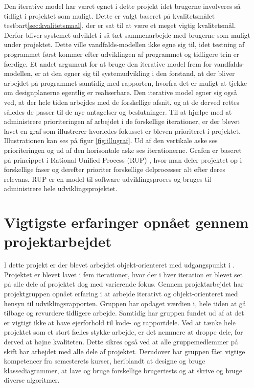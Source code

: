 Den iterative model har været egnet i dette projekt idet brugerne involveres så tidligt i projektet som muligt. Dette er valgt baseret på kvalitetsmålet testbart\ref{sec:kvalitetsmaal}, der er sat til at være et meget vigtig kvalitetsmål. Derfor bliver systemet udviklet i så tæt sammenarbejde med brugerne som muligt under projektet. Dette ville vandfalds-modellen ikke egne sig til, idet testning af programmet først kommer efter udviklingen af programmet og tidligere trin er færdige.
Et andet argument for at bruge den iterative model frem for vandfalds-modellen, er at den egner sig til systemudvikling i den forstand, at der bliver arbejdet på programmet samtidig med rapporten, hvorfra det er muligt at tjekke om designplanerne egentlig er realiserbare. Den iterative model egner sig også ved, at der hele tiden arbejdes med de forskellige afsnit, og at de derved rettes således de passer til de nye antagelser og beslutninger.
Til at hjælpe med at administrere prioriteringen af arbejdet i de forskellige iterationer, er der blevet lavet en graf som illustrerer hvorledes fokusset er bleven prioriteret i projektet. Illustrationen kan ses på figur \ref{fig:illugraf}. Ud af den vertikale aske ses prioriteringen og ud af den horisontale aske ses iterationerne. Grafen er baseret på princippet i Rational Unified Process (RUP) \citep{RUP}, hvor man deler projektet op i forskellige faser og derefter prioriter forskellige delprocesser alt efter deres relevans. RUP er en model til software udviklingsproces og bruges til administrere hele udviklingsprojektet.


\section{Vigtigste erfaringer opnået gennem projektarbejdet}
I dette projekt er der blevet arbejdet objekt-orienteret med udgangspunkt i \citep{ooaogd}. Projektet er blevet lavet i fem iterationer, hvor der i hver iteration er blevet set på alle dele af projektet dog med varierende fokus.
Gennem projektarbejdet har projektgruppen opnået erfaring i at arbejde iterativt og objekt-orienteret med hensyn til udviklingsrapporten. Gruppen har opdaget værdien i, hele tiden at gå tilbage og revurdere tidligere arbejde. Samtidig har gruppen fundet ud af at det er vigtigt ikke at have ejerforhold til kode- og rapportdele. Ved at tænke hele projektet som et stort fælles stykke arbejde, er det nemmere at droppe dele, for derved at højne kvaliteten. Dette sikres også ved at alle gruppemedlemmer på skift har arbejdet med alle dele af projektet. Derudover har gruppen fået vigtige kompetencer fra semesterets kurser, heriblandt at designe og bruge klassediagrammer, at lave og bruge forskellige brugertests og at skrive og bruge diverse algoritmer. 